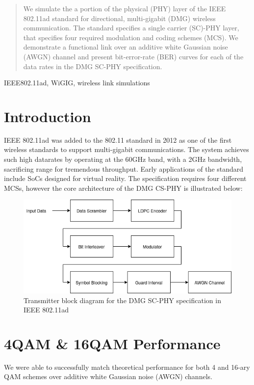 \documentclass[conference]{IEEEtran}
\begin{document}
\begin{abstract}
We simulate the a portion of the physical (PHY) layer of the IEEE 802.11ad standard for directional, multi-gigabit (DMG) wireless communication. The standard specifies a single carrier (SC)-PHY layer, that specifies four required modulation and coding schemes (MCS). We demonstrate a functional link over an additive white Gaussian noise (AWGN) channel and present bit-error-rate (BER) curves for each of the data rates in the DMG SC-PHY specification. 
\end{abstract}

\begin{IEEEkeywords}
IEEE802.11ad, WiGIG, wireless link simulations
\end{IEEEkeywords}

\section{Introduction}

IEEE 802.11ad was added to the 802.11 standard in 2012 as one of the first wireless standards to support multi-gigabit communications. The system achieves such high datarates by operating at the 60GHz band, with a 2GHz bandwidth, sacrificing range for tremendous throughput. Early applications of the standard include SoCs designed for virtual reality. The specification requires four different MCSs, however the core architecture of the DMG CS-PHY is illustrated below:
\begin{figure}[htbp]
\centerline{\includegraphics[scale=.4]{./media/phy.png}}
\caption{Transmitter block diagram for the DMG SC-PHY specification in IEEE 802.11ad}
\label{4ber}
\end{figure}

\section{4QAM \& 16QAM Performance}
We were able to successfully match theoretical performance for both 4 and 16-ary QAM schemes over additive white Gaussian noise (AWGN) channels. 
\end{document}
